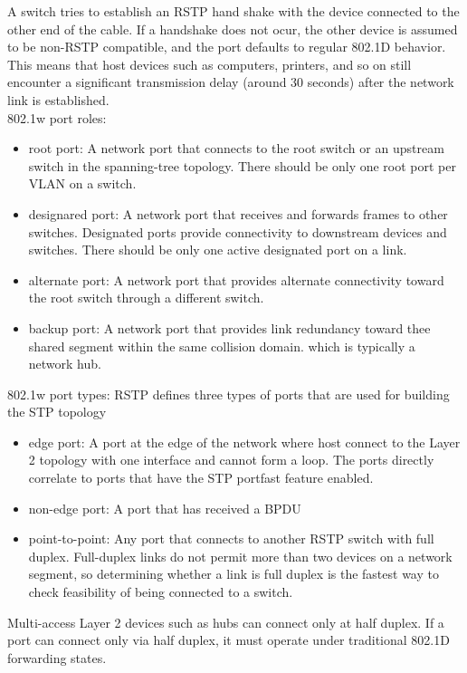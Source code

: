 \documentclass{article}
\begin{document}
A switch tries to establish an RSTP hand shake with the device connected to the other end of the cable. If a handshake does not ocur, the other device is assumed to be non-RSTP compatible, and the port defaults to regular 802.1D behavior. This means that host devices such as computers, printers, and so on still encounter a significant transmission delay (around 30 seconds) after the network link is established.\\

802.1w port roles:
	\begin{itemize}
		\item root port: A network port that connects to the root switch or an upstream switch in the spanning-tree topology. There should be only one root port per VLAN on a switch.
		\item designared port: A network port that receives and forwards frames to other switches. Designated ports provide connectivity to downstream devices and switches. There should be only one active designated port on a link.
		\item alternate port: A network port that provides alternate connectivity toward the root switch through a different switch.
		\item backup port: A network port that provides link redundancy toward thee shared segment within the same collision domain. which is typically a network hub.
	\end{itemize}

802.1w port types: RSTP defines three types of ports that are used for building the STP topology
	\begin{itemize}
		\item edge port: A port at the edge of the network where host connect to the Layer 2 topology with one interface and cannot form a loop. The ports directly correlate to ports that have the STP portfast feature enabled.
		\item non-edge port: A port that has received a BPDU
		\item point-to-point: Any port that connects to another RSTP switch with full duplex. Full-duplex links do not permit more than two devices on a network segment, so determining whether a link is full duplex is the fastest way to check feasibility of being connected to a switch.
	\end{itemize}

Multi-access Layer 2 devices such as hubs can connect only at half duplex. If a port can connect only via half duplex, it must operate under traditional 802.1D forwarding states.\\
\end{document}
